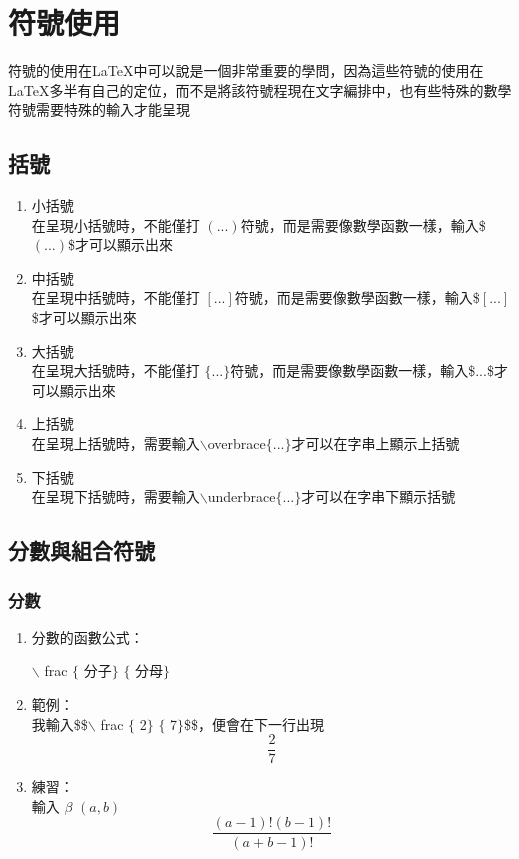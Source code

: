 \section{{符號使用}}
符號的使用在\LaTeX 中可以說是一個非常重要的學問，因為這些符號的使用在\LaTeX 多半有自己的定位，而不是將該符號程現在文字編排中，也有些特殊的數學符號需要特殊的輸入才能呈現
\subsection{括號}
\begin{enumerate}
\item \textcolor{bole}{小括號}\\
在呈現小括號時，不能僅打 $(...)$符號，而是需要像數學函數一樣，輸入\$$(...)$\$才可以顯示出來\\
\item \textcolor{bole}{中括號}\\
在呈現中括號時，不能僅打 $[...]$符號，而是需要像數學函數一樣，輸入\$$[...]$\$才可以顯示出來\\
\item \textcolor{bole}{大括號}\\
在呈現大括號時，不能僅打 $\{...\}$符號，而是需要像數學函數一樣，輸入\$${...}$\$才可以顯示出來\\
\item \textcolor{bole}{上括號}\\
在呈現上括號時，需要輸入$\backslash$overbrace$\{...\}$才可以在字串上顯示上括號\\
\item \textcolor{bole}{下括號}\\
在呈現下括號時，需要輸入$\backslash$underbrace$\{...\}$才可以在字串下顯示括號\\
\end{enumerate}
\subsection{分數與組合符號}
\subsubsection{分數}
\begin{enumerate}
\item 分數的函數公式：\\
\begin{center}
$\backslash$ frac $\{$ 分子$\}$ $\{$ 分母$\}$
\end{center}
\item 範例：\\
我輸入\$\$$\backslash$ frac $\{$ 2$\}$ $\{$ 7$\}$\$\$，便會在下一行出現$$\frac{2}{7}$$
\item 練習：\\
輸入 $\beta$ $(a, b)$
\begin{equation} \label{frac2}
\frac{(a-1)!(b-1)!}{(a+b-1)!}
\end{equation}

\end{enumerate}


